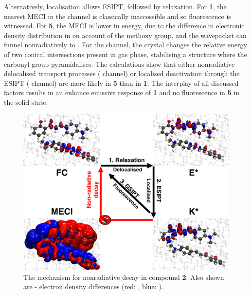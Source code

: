 Alternatively, localisation allows ESIPT, followed by relaxation. For \textbf{1}, the nearest MECI in the \Kstar{} channel is classically inaccessible and so fluorescence is witnessed. For \textbf{5}, the MECI is lower in energy, due to the difference in electronic density distribution in \sone{} on account of the methoxy group, and the wavepacket can funnel nonradiatively to \szero{}. For the \Kstar{} channel, the crystal changes the relative energy of two conical intersections present in gas phase, stabilising a structure where the carbonyl group pyramidalises. The calculations show that either nonradiative delocalised transport processes (\Estar{} channel) or localised deactivation through the ESIPT (\Kstar{} channel) are more likely in \textbf{5} than in \textbf{1}. The interplay of all discussed factors results in an enhance emissive response of \textbf{1} and no fluorescence in \textbf{5} in the solid state. 

\begin{figure}
  \centering
  \includegraphics[width=0.8\linewidth]{4IntraInterInteractions/HC_1_Density_Mechanism.pdf}
  \caption[Radiative decay in \textbf{HC1}]{The mechanism for nonradiative decay in compound \textbf{2}. Also shown are \sone-\szero{} electron density differences (red: \sone{}, blue: \szero{}).}
  \label{figure: HC_1_Density_Mechanism}
\end{figure}

